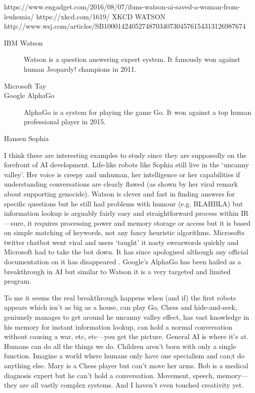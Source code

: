 https://www.engadget.com/2016/08/07/ibms-watson-ai-saved-a-woman-from-leukemia/
https://xkcd.com/1619/ XKCD WATSON
http://www.wsj.com/articles/SB10001424052748703407304576154313126987674

\begin{description}
  \item[IBM Watson] Watson is a question answering expert system. It famously won against human Jeopardy! champions in 2011.
  \item[Microsoft Tay] 
  \item[Google AlphaGo] AlphaGo is a system for playing the game Go. It won against a top human professional player in 2015.
  \item[Hansen Sophia]
\end{description}

I think these are interesting examples to study since they are supposedly on the forefront of \ac{AI} development. Life-like robots like Sophia still live in the `uncanny valley'. Her voice is creepy and unhuman, her intelligence or her capabilities if understanding conversations are clearly flawed (as shown by her viral remark about supporting genocide). Watson is clever and fast in finding answers for specific questions but he still had problems with humour (e.g. BLAHBLA) but information lookup is arguably fairly easy and straightforward process within \ac{IR}---sure, it requires processing power and memory storage or access but it is based on simple matching of keywords, not any fancy heuristic algorithms. Microsofts twitter chatbot went viral and users `taught' it nasty swearwords  quickly and Microsoft had to take the bot down. It has since apologised although any official documentation on it has disappeared . Google's AlphaGo has been hailed as a breakthrough in \ac{AI} but similar to Watson it is a very targeted and limited program. 

To me it seems the real breakthrough happens when (and if) the first robots appears which isn't as big as a house, can play Go, Chess and hide-and-seek, geniunely manages to get around he uncanny valley effect, has vast knowledge in his memory for instant information lookup, can hold a normal conversation without causing a war, etc, etc---you get the picture. General \ac{AI} is where it's at. Humans can do all the things we do. Children aren't born with only a single function. Imagine a world where humans only have one specialism and can;t do anything else. Mary is a Chess player but can't move her arms. Bob is a medical diagnosis expert but he can't hold a conversation. Movement, speech, memory---they are all vastly complex systems. And I haven't even touched creativity yet.

